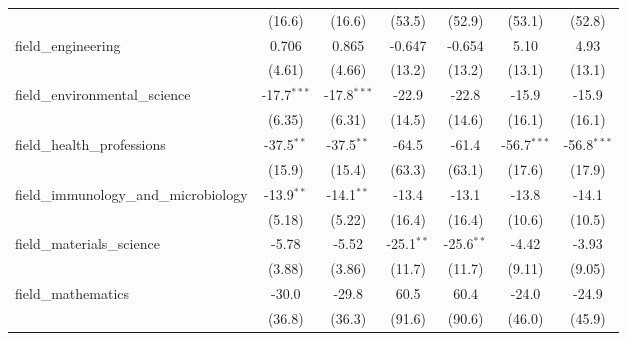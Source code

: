 \begin{tabular}{lcccccc}
                                                               & (16.6)         & (16.6)         & (53.5)         & (52.9)         & (53.1)        & (52.8)\\   
   field\_engineering                                          & 0.706          & 0.865          & -0.647         & -0.654         & 5.10          & 4.93\\   
                                                               & (4.61)         & (4.66)         & (13.2)         & (13.2)         & (13.1)        & (13.1)\\   
   field\_environmental\_science                               & -17.7$^{***}$  & -17.8$^{***}$  & -22.9          & -22.8          & -15.9         & -15.9\\   
                                                               & (6.35)         & (6.31)         & (14.5)         & (14.6)         & (16.1)        & (16.1)\\   
   field\_health\_professions                                  & -37.5$^{**}$   & -37.5$^{**}$   & -64.5          & -61.4          & -56.7$^{***}$ & -56.8$^{***}$\\   
                                                               & (15.9)         & (15.4)         & (63.3)         & (63.1)         & (17.6)        & (17.9)\\   
   field\_immunology\_and\_microbiology                        & -13.9$^{**}$   & -14.1$^{**}$   & -13.4          & -13.1          & -13.8         & -14.1\\   
                                                               & (5.18)         & (5.22)         & (16.4)         & (16.4)         & (10.6)        & (10.5)\\   
   field\_materials\_science                                   & -5.78          & -5.52          & -25.1$^{**}$   & -25.6$^{**}$   & -4.42         & -3.93\\   
                                                               & (3.88)         & (3.86)         & (11.7)         & (11.7)         & (9.11)        & (9.05)\\   
   field\_mathematics                                          & -30.0          & -29.8          & 60.5           & 60.4           & -24.0         & -24.9\\   
                                                               & (36.8)         & (36.3)         & (91.6)         & (90.6)         & (46.0)        & (45.9)\\   

\end{tabular}

